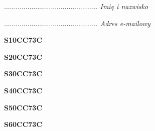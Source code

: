 \begin{turn}{90}\begin{minipage}{\linewidth} \vspace{20mm} ................................................  \textit{Imię i nazwisko}\end{minipage}\end{turn}

\begin{turn}{90}\begin{minipage}{\linewidth} \vspace{20mm} ................................................  \textit{Adres e-mailowy}\end{minipage}\end{turn}

\begin{turn}{90}\huge \begin{minipage}{\linewidth} \vspace{10mm}\textbf{S10CC73C}\end{minipage}\end{turn}

\begin{turn}{90}\huge \begin{minipage}{\linewidth} \vspace{10mm}\textbf{S20CC73C}\end{minipage}\end{turn}

\begin{turn}{90}\huge \begin{minipage}{\linewidth} \vspace{10mm}\textbf{S30CC73C}\end{minipage}\end{turn}

\begin{turn}{90}\huge \begin{minipage}{\linewidth} \vspace{10mm}\textbf{S40CC73C}\end{minipage}\end{turn}

\begin{turn}{90}\huge \begin{minipage}{\linewidth} \vspace{10mm}\textbf{S50CC73C}\end{minipage}\end{turn}

\begin{turn}{90}\huge \begin{minipage}{\linewidth} \vspace{10mm}\textbf{S60CC73C}\end{minipage}\end{turn}

